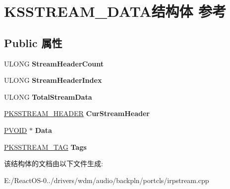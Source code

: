 \hypertarget{struct_k_s_s_t_r_e_a_m___d_a_t_a}{}\section{K\+S\+S\+T\+R\+E\+A\+M\+\_\+\+D\+A\+T\+A结构体 参考}
\label{struct_k_s_s_t_r_e_a_m___d_a_t_a}
\subsection*{Public 属性}
\begin{DoxyCompactItemize}
\item 
\mbox{\label{struct_k_s_s_t_r_e_a_m___d_a_t_a_a25c04b560870677af8b0a19e4e755be1}} 
U\+L\+O\+NG {\bfseries Stream\+Header\+Count}
\item 
\mbox{\label{struct_k_s_s_t_r_e_a_m___d_a_t_a_ae99cb21218e96a2323da2e1045df59f8}} 
U\+L\+O\+NG {\bfseries Stream\+Header\+Index}
\item 
\mbox{\label{struct_k_s_s_t_r_e_a_m___d_a_t_a_a0c1ac19236390bbdeb21ed53f00b0fc5}} 
U\+L\+O\+NG {\bfseries Total\+Stream\+Data}
\item 
\mbox{\label{struct_k_s_s_t_r_e_a_m___d_a_t_a_a90fceba8e37bb813e9f346e88e535205}} 
\hyperlink{struct_k_s_s_t_r_e_a_m___h_e_a_d_e_r}{P\+K\+S\+S\+T\+R\+E\+A\+M\+\_\+\+H\+E\+A\+D\+ER} {\bfseries Cur\+Stream\+Header}
\item 
\mbox{\label{struct_k_s_s_t_r_e_a_m___d_a_t_a_adae9c937c081fe637b552651959f4a04}} 
\hyperlink{interfacevoid}{P\+V\+O\+ID} $\ast$ {\bfseries Data}
\item 
\mbox{\label{struct_k_s_s_t_r_e_a_m___d_a_t_a_ad608a6416bb3b8bdbea012f1d932baff}} 
\hyperlink{struct_k_s_s_t_r_e_a_m___t_a_g}{P\+K\+S\+S\+T\+R\+E\+A\+M\+\_\+\+T\+AG} {\bfseries Tags}
\end{DoxyCompactItemize}


该结构体的文档由以下文件生成\+:\begin{DoxyCompactItemize}
\item 
E\+:/\+React\+O\+S-\/0../drivers/wdm/audio/backpln/portcls/irpstream.\+cpp\end{DoxyCompactItemize}

